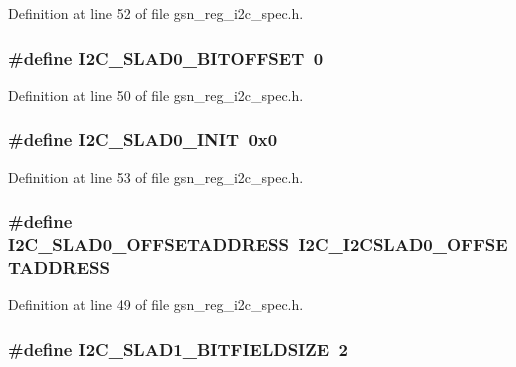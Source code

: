 Definition at line 52 of file gsn\_\-reg\_\-i2c\_\-spec.h.

\hypertarget{a00558_a3fb2ad3a29bb48a9b94931ba57b246b1}{
\subsubsection[{I2C\_\-SLAD0\_\-BITOFFSET}]{\setlength{\rightskip}{0pt plus 5cm}\#define I2C\_\-SLAD0\_\-BITOFFSET~0}}
\label{a00558_a3fb2ad3a29bb48a9b94931ba57b246b1}


Definition at line 50 of file gsn\_\-reg\_\-i2c\_\-spec.h.

\hypertarget{a00558_ab97cdd139517bdc8b6dac090c354ead5}{
\subsubsection[{I2C\_\-SLAD0\_\-INIT}]{\setlength{\rightskip}{0pt plus 5cm}\#define I2C\_\-SLAD0\_\-INIT~0x0}}
\label{a00558_ab97cdd139517bdc8b6dac090c354ead5}


Definition at line 53 of file gsn\_\-reg\_\-i2c\_\-spec.h.

\hypertarget{a00558_a09a45b2e139e03c96e3e89c0362d4ca3}{
\subsubsection[{I2C\_\-SLAD0\_\-OFFSETADDRESS}]{\setlength{\rightskip}{0pt plus 5cm}\#define I2C\_\-SLAD0\_\-OFFSETADDRESS~I2C\_\-I2CSLAD0\_\-OFFSETADDRESS}}
\label{a00558_a09a45b2e139e03c96e3e89c0362d4ca3}


Definition at line 49 of file gsn\_\-reg\_\-i2c\_\-spec.h.

\hypertarget{a00558_a62ec92680167acf2a29a0c655f445aef}{
\subsubsection[{I2C\_\-SLAD1\_\-BITFIELDSIZE}]{\setlength{\rightskip}{0pt plus 5cm}\#define I2C\_\-SLAD1\_\-BITFIELDSIZE~2}}
\label{a00558_a62ec92680167acf2a29a0c655f445aef}


